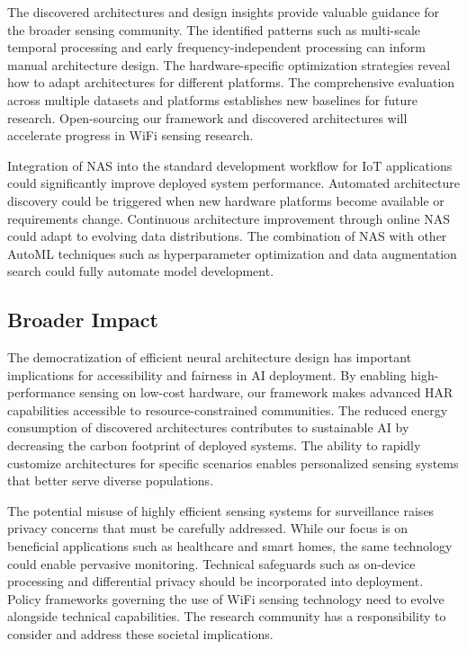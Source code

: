\documentclass[journal]{IEEEtran}
\begin{document}
The discovered architectures and design insights provide valuable guidance for the broader sensing community. The identified patterns such as multi-scale temporal processing and early frequency-independent processing can inform manual architecture design. The hardware-specific optimization strategies reveal how to adapt architectures for different platforms. The comprehensive evaluation across multiple datasets and platforms establishes new baselines for future research. Open-sourcing our framework and discovered architectures will accelerate progress in WiFi sensing research.

Integration of NAS into the standard development workflow for IoT applications could significantly improve deployed system performance. Automated architecture discovery could be triggered when new hardware platforms become available or requirements change. Continuous architecture improvement through online NAS could adapt to evolving data distributions. The combination of NAS with other AutoML techniques such as hyperparameter optimization and data augmentation search could fully automate model development.

\subsection{Broader Impact}

The democratization of efficient neural architecture design has important implications for accessibility and fairness in AI deployment. By enabling high-performance sensing on low-cost hardware, our framework makes advanced HAR capabilities accessible to resource-constrained communities. The reduced energy consumption of discovered architectures contributes to sustainable AI by decreasing the carbon footprint of deployed systems. The ability to rapidly customize architectures for specific scenarios enables personalized sensing systems that better serve diverse populations.

The potential misuse of highly efficient sensing systems for surveillance raises privacy concerns that must be carefully addressed. While our focus is on beneficial applications such as healthcare and smart homes, the same technology could enable pervasive monitoring. Technical safeguards such as on-device processing and differential privacy should be incorporated into deployment. Policy frameworks governing the use of WiFi sensing technology need to evolve alongside technical capabilities. The research community has a responsibility to consider and address these societal implications.
\end{document}
